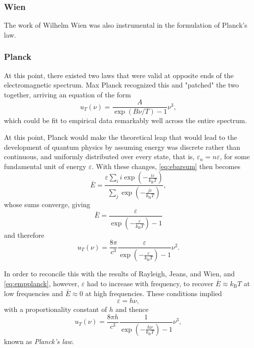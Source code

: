 \documentclass{article}
\begin{document}
\subsubsection{Wien}
The work of Wilhelm Wien was also instrumental in the formulation of Planck's law.


\subsubsection{Planck}
At this point, there existed two laws that were valid at opposite ends of the electromagnetic spectrum. Max Planck recognized this and "patched" the two together, arriving an equation of the form
\begin{equation}
    u_T(\nu) = \frac{A}{\exp(B\nu/T) - 1}\nu^3,
    \label{eq:empplanck}
\end{equation}
which could be fit to empirical data remarkably well across the entire spectrum.

At this point, Planck would make the theoretical leap that would lead to the development of quantum physics by assuming energy was discrete rather than continuous, and uniformly distributed over every state, that is, $\varepsilon_n = n\varepsilon$, for some fundamental unit of energy $\varepsilon$. With these changes, \autoref{eq:ebarsum} then becomes
\begin{equation*}
        \bar{E} = \frac{\varepsilon\sum_i i \exp\left( -\frac{i \varepsilon}{k_\mathrm{B} T} \right)}{\sum_j\exp\left( -\frac{j \varepsilon}{k_\mathrm{B}T} \right)},
\end{equation*}
whose sums converge, giving
\begin{equation*}
    \bar{E} = \frac{\varepsilon}{\exp\left(-\frac{\varepsilon}{k_\text{B}T}\right) - 1}
\end{equation*}
and therefore
\begin{equation*}
    u_T(\nu) = \frac{8\pi}{c^3}\frac{\varepsilon}{\exp\left(-\frac{\varepsilon}{k_\text{B}T}\right) - 1}\nu^2.
\end{equation*}

In order to reconcile this with the results of Rayleigh, Jeans, and Wien, and \autoref{eq:empplanck}, however, $\varepsilon$ had to increase with frequency, to recover $\bar{E}\approx k_\text{B}T$ at low frequencies and $\bar{E} \approx 0$ at high frequencies. These conditions implied
\begin{equation}
    \varepsilon = h\nu,
    \label{eq:planckrel}
\end{equation}
with a proportionality constant of $h$ and thence
\begin{equation}
    u_T(\nu) = \frac{8\pi h}{c^3}\frac{1}{\exp\left(-\frac{h\nu}{k_\text{B}T}\right) - 1}\nu^3,
\end{equation}
known as \emph{Planck's law}.
\end{document}
